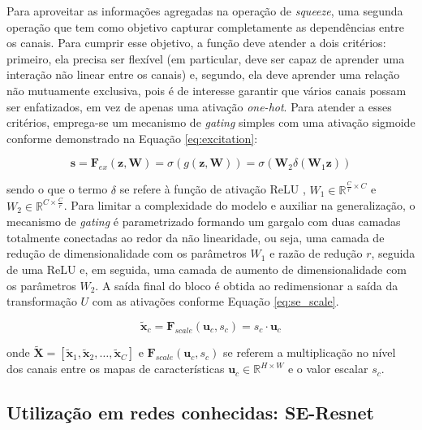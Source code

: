 Para aproveitar as informações agregadas na operação de \textit{squeeze}, uma segunda operação que tem como objetivo capturar completamente as dependências entre os canais. Para cumprir esse objetivo, a função deve atender a dois critérios: primeiro, ela precisa ser flexível (em particular, deve ser capaz de aprender uma interação não linear entre os canais) e, segundo, ela deve aprender uma relação não mutuamente exclusiva, pois é de interesse garantir que vários canais possam ser enfatizados, em vez de apenas uma ativação \textit{one-hot}. Para atender a esses critérios, emprega-se um mecanismo de \textit{gating} simples com uma ativação sigmoide conforme demonstrado na Equação \ref{eq:excitation}:

\begin{equation}
\mathbf{s} = \mathbf{F}_{ex}(\mathbf{z}, \mathbf{W}) = \sigma(g(\mathbf{z}, \mathbf{W})) = \sigma(\mathbf{W}_2 \delta(\mathbf{W}_1 \mathbf{z}))
\label{eq:excitation}
\end{equation}

\noindent sendo o que o termo $\delta$ se refere à função de ativação ReLU \cite{nairRectifiedLinearUnits}, $W_1 \in \mathbb{R}^{\frac{C}{r} \times C}$ e $W_2 \in \mathbb{R}^{C \times \frac{C}{r}}$. Para limitar a complexidade do modelo e auxiliar na generalização, o mecanismo de \textit{gating} é parametrizado formando um gargalo com duas camadas totalmente conectadas ao redor da não linearidade, ou seja, uma camada de redução de dimensionalidade com os parâmetros $W_1$ e razão de redução $r$, seguida de uma ReLU e, em seguida, uma camada de aumento de dimensionalidade com os parâmetros $W_2$. A saída final do bloco é obtida ao redimensionar a saída da transformação $U$ com as ativações conforme Equação \ref{eq:se_scale}.

\begin{equation}
\tilde{\mathbf{x}}_c = \mathbf{F}_{scale}(\mathbf{u}_c, s_c) = s_c \cdot \mathbf{u}_c 
\label{eq:se_scale}
\end{equation}

\noindent onde $\tilde{\mathbf{X}} = [\tilde{\mathbf{x}}_1, \tilde{\mathbf{x}}_2, \dots, \tilde{\mathbf{x}}_C]$ e $\mathbf{F}_{scale}(\mathbf{u}_c, s_c)$ se referem a multiplicação no nível dos canais entre os mapas de características $\mathbf{u}_c \in \mathbb{R}^{H \times W}$ e o valor escalar $s_c$.

\subsection{Utilização em redes conhecidas: SE-Resnet}
\label{subsec:util_resnet}

